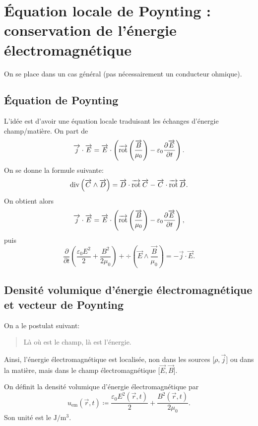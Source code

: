 \section[Équation locale de Poynting]{Équation locale de Poynting : conservation de l'énergie électromagnétique}

On se place dans un cas général (pas nécessairement un conducteur ohmique).

\subsection{Équation de Poynting}

L'idée est d'avoir une équation locale traduisant les échanges d'énergie champ/matière.
On part de
\begin{equation}
    \protect\overrightarrow{{j}}\cdot\protect\overrightarrow{{E}}=\protect\overrightarrow{{E}}\cdot\left(
        \operatorname{\overrightarrow{\text{rot}}}\left(\frac{\protect\overrightarrow{{B}}}{\mu_0}\right)-\varepsilon_0\frac{\partial\protect\overrightarrow{{E}}}{\partial t}
    \right).
\end{equation}
On se donne la formule suivante:
\begin{equation}
    \operatorname{div}\left(\protect\overrightarrow{{C}}\wedge\protect\overrightarrow{{D}}\right)=\protect\overrightarrow{{D}}\cdot\operatorname{\overrightarrow{\text{rot}}}\protect\overrightarrow{{C}}-\protect\overrightarrow{{C}}\cdot\operatorname{\overrightarrow{\text{rot}}}\protect\overrightarrow{{D}}.
\end{equation}
On obtient alors
\begin{equation}
    \protect\overrightarrow{{j}}\cdot\protect\overrightarrow{{E}}=\protect\overrightarrow{{E}}\cdot\left(\operatorname{\overrightarrow{\text{rot}}}\left(\frac{\protect\overrightarrow{{B}}}{\mu_0}\right)-\varepsilon_0\frac{\partial\protect\overrightarrow{{E}}}{\partial t}\right),
\end{equation}
puis
\begin{equation}
    \boxed{
        \frac{\partial}{\partial t}\left(
            \frac{\varepsilon_0 E^{2}}{2}+\frac{B^{2}}{2\mu_0}
        \right)+\div\left(\vec{E}\wedge\frac{\vec{B}}{\mu_0}\right)=-\vec{j}\cdot\vec{E}.
    }
\end{equation}

\subsection{Densité volumique d'énergie électromagnétique et vecteur de Poynting}

On a le postulat suivant:
\begin{quote}
    Là où est le champ, là est l'énergie.
\end{quote}
Ainsi, l'énergie électromagnétique est localisée, non dans les sources [$\rho,\vec{j}$] ou dans la matière, mais dans le champ électromagnétique [$\vec{E},\vec{B}$].

On définit la densité volumique d'énergie électromagnétique par 
\begin{equation}
    \boxed{
        u_{\mathrm{em}}(\vec{r},t)\coloneqq\frac{\varepsilon_0 E^{2}(\vec{r},t)}{2}+\frac{B^{2}(\vec{r},t)}{2\mu_0}.
    }
\end{equation}
Son unité est le $\si{\joule\per\metre\cubed}$.

